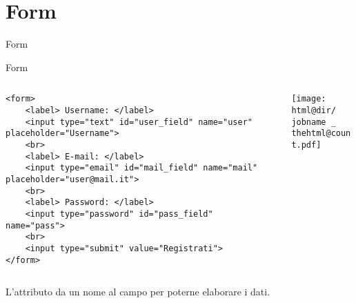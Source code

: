 \section{Form}

\begin{frame}[fragile]{Form}\transfade\centering
\end{frame}
\begin{frame}[fragile]{Form}\transfade\centering
  \begin{columns}
    \begin{column}{.56\textwidth}
      \begin{verbatim}
<form>
    <label> Username: </label>
    <input type="text" id="user_field" name="user" placeholder="Username">
    <br>
    <label> E-mail: </label>
    <input type="email" id="mail_field" name="mail" placeholder="user@mail.it">
    <br>
    <label> Password: </label>
    <input type="password" id="pass_field" name="pass">
    <br>
    <input type="submit" value="Registrati">
</form>
      \end{verbatim}
    \end{column}
    \hfill
    \begin{column}{.42\textwidth}
      \makeatletter
      \texttt{[image: \\html@dir/\\jobname \_\\thehtml@count.pdf]}
      \makeatother
    \end{column}
  \end{columns}
  \bigskip
  L'attributo  da un nome al campo  per poterne elaborare i dati.\\
\end{frame}
